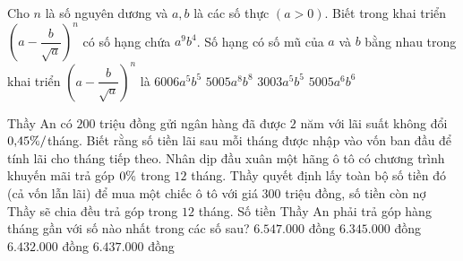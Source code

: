 \begin{ex}%
	Cho $n$ là số nguyên dương và $a,b$ là các số thực $(a>0)$. Biết trong khai triển $\left(a-\dfrac{b}{\sqrt{a}}\right)^n$ có số hạng chứa $a^9b^4$. Số hạng có số mũ của $a$ và $b$ bằng nhau trong khai triển $\left(a-\dfrac{b}{\sqrt{a}}\right)^n$ là
	\choice
	{$6006a^5b^5$}
	{$5005a^8b^8$}
	{$3003a^5b^5$}
	{\True $5005a^6b^6$}
\end{ex}

\begin{ex}%
	Thầy An có $200$ triệu đồng gửi ngân hàng đã được $2$ năm với lãi suất không đổi $0{,}45\symbol{37}/$tháng. Biết rằng số tiền lãi sau mỗi tháng được nhập vào vốn ban đầu để tính lãi cho tháng tiếp theo. Nhân dịp đầu xuân một hãng  ô tô có chương trình khuyến mãi trả góp $0\symbol{37}$ trong $12$ tháng. Thầy quyết định lấy toàn bộ số tiền đó (cả vốn lẫn lãi) để mua một chiếc ô tô với giá 300 triệu đồng, số tiền còn nợ Thầy sẽ chia đều trả góp trong $12$ tháng. Số tiền Thầy An phải trả góp hàng tháng gần với số nào nhất trong các số sau?
	\choice
	{$6.547.000$ đồng}
	{$6.345.000$ đồng}
	{$6.432.000$ đồng}
	{\True $6.437.000$ đồng}
\end{ex}

